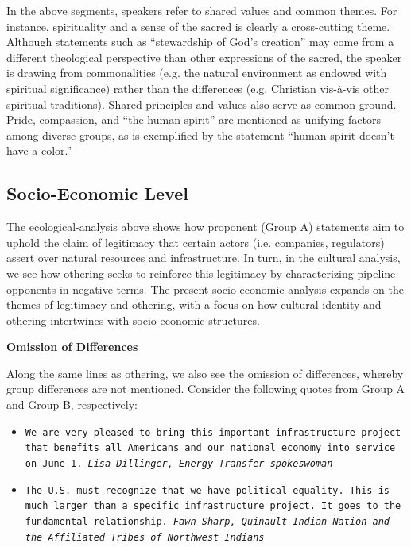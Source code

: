 In the above segments, speakers refer to shared values and common themes. For instance, spirituality and a sense of the sacred is clearly a cross-cutting theme. Although statements such as ``stewardship of God's creation'' may come from a different theological perspective than other expressions of the sacred, the speaker is drawing from commonalities (e.g. the natural environment as endowed with spiritual significance) rather than the differences (e.g. Christian vis-\`a-vis other spiritual traditions). Shared principles and values also serve as common ground. Pride, compassion, and ``the human spirit'' are mentioned as unifying factors among diverse groups, as is exemplified by the statement ``human spirit doesn't have a color.''

\subsection{Socio-Economic Level}

The ecological-analysis above shows how proponent (Group A) statements aim to uphold the claim of legitimacy that certain actors (i.e. companies, regulators) assert over natural resources and infrastructure. In turn, in the cultural analysis, we see how othering seeks to reinforce this legitimacy by characterizing pipeline opponents in negative terms. The present socio-economic analysis expands on the themes of legitimacy and othering, with a focus on how cultural identity and othering intertwines with socio-economic structures.

\textbf{Omission of Differences}

Along the same lines as othering, we also see the omission of differences, whereby group differences are not mentioned. Consider the following quotes from Group A and Group B, respectively: 

\begin{footnotesize}
\begin{itemize}
\item[] \texttt{We are very pleased to bring this important infrastructure project that benefits all Americans and our national economy into service on June 1.\newline \textit{-Lisa Dillinger, Energy Transfer spokeswoman}}
\newline
\item[] \texttt{The U.S. must recognize that we have political equality.  This is much larger than a specific infrastructure project. It goes to the fundamental relationship.\newline \textit{-Fawn Sharp, Quinault Indian Nation and the Affiliated Tribes of Northwest Indians}}
\end{itemize}
\end{footnotesize}

